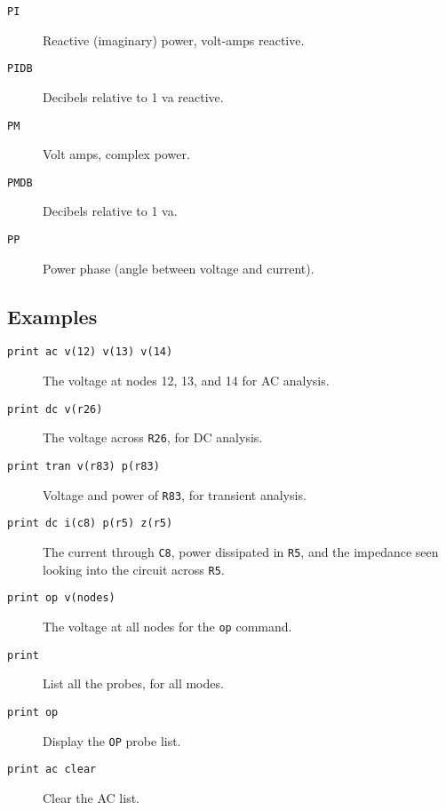 \begin{description}

\item[{\tt PI}] Reactive (imaginary) power, volt-amps reactive.

\item[{\tt PIDB}] Decibels relative to 1 va reactive.

\item[{\tt PM}] Volt amps, complex power.

\item[{\tt PMDB}] Decibels relative to 1 va.

\item[{\tt PP}] Power phase (angle between voltage and current).  

\end{description}
\subsection{Examples}

\begin{description}

\item[{\tt print ac v(12) v(13) v(14)}] The voltage at nodes 12, 13, and 14
for AC analysis.

\item[{\tt print dc v(r26)}] The voltage across {\tt R26}, for DC analysis.

\item[{\tt print tran v(r83) p(r83)}] Voltage and power of {\tt R83}, for
transient analysis.

\item[{\tt print dc i(c8) p(r5) z(r5)}] The current through {\tt C8}, power
dissipated in {\tt R5}, and the impedance seen looking into the circuit
across {\tt R5}.

\item[{\tt print op v(nodes)}] The voltage at all nodes for the {\tt op}
command.

\item[{\tt print}] List all the probes, for all modes.

\item[{\tt print op}] Display the {\tt OP} probe list.

\item[{\tt print ac clear}] Clear the AC list.

\end{description}
